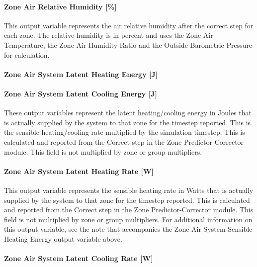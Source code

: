 \paragraph{Zone Air Relative Humidity {[}\%{]}}\label{zone-air-relative-humidity}

This output variable represents the air relative humidity after the correct step for each zone. The relative humidity is in percent and uses the Zone Air Temperature, the Zone Air Humidity Ratio and the Outside Barometric Pressure for calculation.

\paragraph{Zone Air System Latent Heating Energy {[}J{]}}\label{zone-air-system-latent-heating-energy-j}

\paragraph{Zone Air System Latent Cooling Energy {[}J{]}}\label{zone-air-system-latent-cooling-energy-j}

These output variables represent the latent heating/cooling energy in Joules that is actually supplied by the system to that zone for the timestep reported. This is the sensible heating/cooling rate multiplied by the simulation timestep. This is calculated and reported from the Correct step in the Zone Predictor-Corrector module. This field is not multiplied by zone or group multipliers.

\paragraph{Zone Air System Latent Heating Rate {[}W{]}}\label{zone-air-system-latent-heating-rate-w}

This output variable represents the sensible heating rate in Watts that is actually supplied by the system to that zone for the timestep reported. This is calculated and reported from the Correct step in the Zone Predictor-Corrector module. This field is not multiplied by zone or group multipliers. For additional information on this output variable, see the note that accompanies the Zone Air System Sensible Heating Energy output variable above.

\paragraph{Zone Air System Latent Cooling Rate {[}W{]}}\label{zone-air-system-latent-cooling-rate-w}

